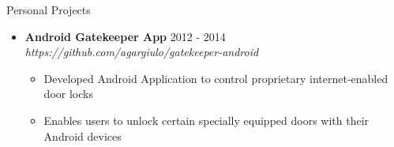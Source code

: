 \documentclass[10pt,oneside]{article}
\newenvironment{ressection}[1]{
	\vspace{3pt}
	{\fontfamily{ppl}\selectfont\Large#1}
	\begin{itemize}
	\vspace{2pt}
}{
	\end{itemize}
}
\newcommand{\ressubitem}[1]{
	\vspace{-1pt}
	\item \begin{flushleft} #1 \end{flushleft}
}
\newcommand{\resaltitem}[3]{
	\vspace{-3pt}
	\item
	\textbf{#1} \hfill #2 \\
	\textit{#3}
}
\newenvironment{resaltsec}[3]{
	\resaltitem{#1}{#2}{#3}
	\vspace{-1pt}
	\begin{itemize}
}{
	\end{itemize}
}
\begin{document}
\begin{ressection}{Personal Projects}


	\begin{resaltsec}{Android Gatekeeper App}{2012 - 2014}{https://github.com/agargiulo/gatekeeper-android}
		\ressubitem{Developed Android Application to control proprietary internet-enabled door locks}
		\ressubitem{Enables users to unlock certain specially equipped doors with their Android devices}
	\end{resaltsec}


\end{ressection}
\end{document}
